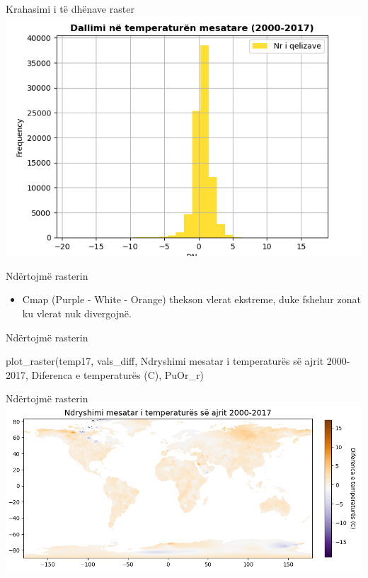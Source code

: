 \documentclass[
  ignorenonframetext,
]{beamer}
\newenvironment{Shaded}{\begin{snugshade}}{\end{snugshade}}
\newcommand{\NormalTok}[1]{#1}
\newcommand{\StringTok}[1]{\textcolor[rgb]{0.31,0.60,0.02}{#1}}
\providecommand{\tightlist}{%
  \setlength{\itemsep}{0pt}\setlength{\parskip}{0pt}}
\begin{document}
\begin{frame}{Krahasimi i të dhënave raster}
\protect\hypertarget{krahasimi-i-tuxeb-dhuxebnave-raster-7}{}
\includegraphics{./Figs/temphist.png}
\end{frame}

\begin{frame}{Ndërtojmë rasterin}
\protect\hypertarget{nduxebrtojmuxeb-rasterin}{}
\begin{itemize}
\tightlist
\item
  Cmap (Purple - White - Orange) thekson vlerat ekstreme, duke fshehur
  zonat ku vlerat nuk divergojnë.
\end{itemize}
\end{frame}

\begin{frame}[fragile]{Ndërtojmë rasterin}
\protect\hypertarget{nduxebrtojmuxeb-rasterin-1}{}

\begin{Shaded}
\begin{Highlighting}[]
\NormalTok{plot\_raster(temp17, vals\_diff, }\StringTok{\textquotesingle{}Ndryshimi mesatar i temperaturës së ajrit 2000{-}2017\textquotesingle{}}\NormalTok{,}
            \StringTok{\textquotesingle{}Diferenca e temperaturës (C)\textquotesingle{}}\NormalTok{, }\StringTok{\textquotesingle{}PuOr\_r\textquotesingle{}}\NormalTok{)}
\end{Highlighting}
\end{Shaded}
\end{frame}

\begin{frame}{Ndërtojmë rasterin}
\protect\hypertarget{nduxebrtojmuxeb-rasterin-2}{}
\includegraphics{./Figs/tempdif.png}
\end{frame}
\end{document}
